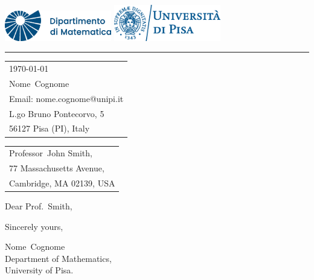 \documentclass{article}
\makeatletter
\newcommand{\nome}{Nome}
\newcommand{\cognome}{Cognome}
\newcommand{\email}{nome.cognome@unipi.it}
\makeatother
\begin{document}

\includegraphics[width=0.35\textwidth]{matematica_dx_blu.eps}
\hfill 
\includegraphics[width=0.35\textwidth]{marchio_unipi_orizz_pant541.eps}

\vspace{-1em} %

\rule{\linewidth}{.5pt} %

\bigskip\bigskip %


\hfill
\begin{tabular}{l @{}}
\hfill \today \bigskip\\ %
\hfill \nome\ \cognome \\
\hfill Email: \email \\
\hfill L.go Bruno Pontecorvo, 5 \\
\hfill 56127 Pisa (PI), Italy \\
\end{tabular}

\bigskip %


\begin{tabular}{@{} l}
	Professor\ John Smith, \\
	77 Massachusetts Avenue, \\
    Cambridge, MA 02139, USA
\end{tabular}

\bigskip

Dear Prof.\ Smith,

\bigskip


\lipsum[1-2]

\bigskip %

Sincerely yours,

\vspace{20pt} %

\nome\ \cognome\\ 
Department of Mathematics, \\
University of Pisa. 
\end{document}
